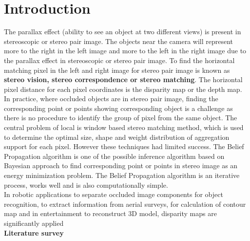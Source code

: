 \documentclass{singlecol-new}
\theoremstyle{TH}{
\newtheorem{lemma}{Lemma}
\newtheorem{theorem}[lemma]{Theorem}
\newtheorem{corrolary}[lemma]{Corrolary}
\newtheorem{conjecture}[lemma]{Conjecture}
\newtheorem{proposition}[lemma]{Proposition}
\newtheorem{claim}[lemma]{Claim}
\newtheorem{stheorem}[lemma]{Wrong Theorem}
\newtheorem{algorithm}{Algorithm}
}
\theoremstyle{THrm}{
\newtheorem{definition}{Definition}[section]
\newtheorem{question}{Question}[section]
\newtheorem{remark}{Remark}
\newtheorem{scheme}{Scheme}
}
\theoremstyle{THhit}{
\newtheorem{case}{Case}[section]
}
\begin{document}
\maketitle
















 \section{Introduction}








The parallax effect (ability to see an object at two different views) is present in stereoscopic or stereo pair image. The objects near the camera will represent more to the right in the left image and more to the left in the right image due to the parallax effect in stereoscopic or stereo pair   image. To find the horizontal matching pixel in the left and right image for stereo pair image is known as \textbf{stereo vision, stereo correspondence or stereo matching}. The horizontal pixel distance for each pixel coordinates is the disparity map or the depth map.\\
In practice, where occluded objects are in stereo pair image, finding the corresponding point or points showing corresponding object is a challenge as there is no procedure to identify the group of pixel from the same object. The central problem of local is window based stereo matching method, which is used to determine the  optimal  size, shape  and  weight  distribution  of  aggregation  support  for  each  pixel. However these techniques had limited success. The Belief Propagation algorithm is one of the possible inference algorithm based on Bayesian approach to find corresponding point or points in stereo image as an energy minimization problem. The Belief Propagation algorithm is an iterative process, works well and is also computationally simple.\\
In robotic applications to separate occluded image components for object recognition, to extract information from aerial surveys, for calculation of contour map and in entertainment to reconstruct 3D model, disparity maps are significantly applied\\
\textbf{Literature survey}\\
\end{document}
